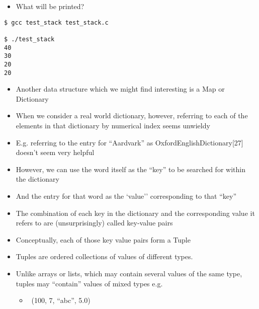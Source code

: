 \documentclass{beamer}
\begin{document}
\begin{frame}
\begin{itemize}
\item What will be printed?
\end{itemize}
\end{frame}

\begin{frame}[fragile]
\begin{block}{}
\begin{lstlisting}
$ gcc test_stack test_stack.c 

$ ./test_stack
40
30
20
20
\end{lstlisting}
\end{block}
\end{frame}

\begin{frame}
\begin{itemize}
\item Another data structure which we might find interesting is a Map or Dictionary
\item When we consider a real world dictionary, however, referring to each of the elements in that dictionary by numerical index seems unwieldy
\item E.g. referring to the entry for ``Aardvark'' as OxfordEnglishDictionary[27] doesn't seem very helpful 
\bigskip
\item However, we can use the word itself as the ``key'' to be searched for within the dictionary 
\item And the entry for that word as the `value'' corresponding to that ``key''
\end{itemize}
\end{frame}

\begin{frame}

\begin{itemize}
\item The combination of each key in the dictionary and the corresponding value it refers to are (unsurprisingly) called key-value pairs
\item Conceptually, each of those key value pairs form a Tuple
\end{itemize}
\end{frame}

\begin{frame}
\begin{itemize}
\item Tuples are ordered collections of values of different types. 
\item Unlike arrays or lists, which may contain several values of the same type, tuples may
``contain'' values of mixed types e.g.
\begin{itemize}
\item \ (100, 7, ``abc'', 5.0)
\end{itemize}
\end{itemize}
\end{frame}
\end{document}
